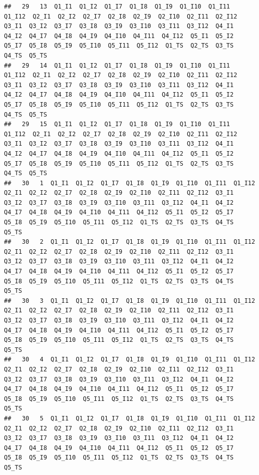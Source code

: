 \documentclass[
]{book}
\begin{document}
\begin{verbatim}
##   29   13  Q1_I1  Q1_I2  Q1_I7  Q1_I8  Q1_I9  Q1_I10  Q1_I11  Q1_I12  Q2_I1  Q2_I2  Q2_I7  Q2_I8  Q2_I9  Q2_I10  Q2_I11  Q2_I12  Q3_I1  Q3_I2  Q3_I7  Q3_I8  Q3_I9  Q3_I10  Q3_I11  Q3_I12  Q4_I1  Q4_I2  Q4_I7  Q4_I8  Q4_I9  Q4_I10  Q4_I11  Q4_I12  Q5_I1  Q5_I2  Q5_I7  Q5_I8  Q5_I9  Q5_I10  Q5_I11  Q5_I12  Q1_TS  Q2_TS  Q3_TS  Q4_TS  Q5_TS
##   29   14  Q1_I1  Q1_I2  Q1_I7  Q1_I8  Q1_I9  Q1_I10  Q1_I11  Q1_I12  Q2_I1  Q2_I2  Q2_I7  Q2_I8  Q2_I9  Q2_I10  Q2_I11  Q2_I12  Q3_I1  Q3_I2  Q3_I7  Q3_I8  Q3_I9  Q3_I10  Q3_I11  Q3_I12  Q4_I1  Q4_I2  Q4_I7  Q4_I8  Q4_I9  Q4_I10  Q4_I11  Q4_I12  Q5_I1  Q5_I2  Q5_I7  Q5_I8  Q5_I9  Q5_I10  Q5_I11  Q5_I12  Q1_TS  Q2_TS  Q3_TS  Q4_TS  Q5_TS
##   29   15  Q1_I1  Q1_I2  Q1_I7  Q1_I8  Q1_I9  Q1_I10  Q1_I11  Q1_I12  Q2_I1  Q2_I2  Q2_I7  Q2_I8  Q2_I9  Q2_I10  Q2_I11  Q2_I12  Q3_I1  Q3_I2  Q3_I7  Q3_I8  Q3_I9  Q3_I10  Q3_I11  Q3_I12  Q4_I1  Q4_I2  Q4_I7  Q4_I8  Q4_I9  Q4_I10  Q4_I11  Q4_I12  Q5_I1  Q5_I2  Q5_I7  Q5_I8  Q5_I9  Q5_I10  Q5_I11  Q5_I12  Q1_TS  Q2_TS  Q3_TS  Q4_TS  Q5_TS
##   30   1  Q1_I1  Q1_I2  Q1_I7  Q1_I8  Q1_I9  Q1_I10  Q1_I11  Q1_I12  Q2_I1  Q2_I2  Q2_I7  Q2_I8  Q2_I9  Q2_I10  Q2_I11  Q2_I12  Q3_I1  Q3_I2  Q3_I7  Q3_I8  Q3_I9  Q3_I10  Q3_I11  Q3_I12  Q4_I1  Q4_I2  Q4_I7  Q4_I8  Q4_I9  Q4_I10  Q4_I11  Q4_I12  Q5_I1  Q5_I2  Q5_I7  Q5_I8  Q5_I9  Q5_I10  Q5_I11  Q5_I12  Q1_TS  Q2_TS  Q3_TS  Q4_TS  Q5_TS
##   30   2  Q1_I1  Q1_I2  Q1_I7  Q1_I8  Q1_I9  Q1_I10  Q1_I11  Q1_I12  Q2_I1  Q2_I2  Q2_I7  Q2_I8  Q2_I9  Q2_I10  Q2_I11  Q2_I12  Q3_I1  Q3_I2  Q3_I7  Q3_I8  Q3_I9  Q3_I10  Q3_I11  Q3_I12  Q4_I1  Q4_I2  Q4_I7  Q4_I8  Q4_I9  Q4_I10  Q4_I11  Q4_I12  Q5_I1  Q5_I2  Q5_I7  Q5_I8  Q5_I9  Q5_I10  Q5_I11  Q5_I12  Q1_TS  Q2_TS  Q3_TS  Q4_TS  Q5_TS
##   30   3  Q1_I1  Q1_I2  Q1_I7  Q1_I8  Q1_I9  Q1_I10  Q1_I11  Q1_I12  Q2_I1  Q2_I2  Q2_I7  Q2_I8  Q2_I9  Q2_I10  Q2_I11  Q2_I12  Q3_I1  Q3_I2  Q3_I7  Q3_I8  Q3_I9  Q3_I10  Q3_I11  Q3_I12  Q4_I1  Q4_I2  Q4_I7  Q4_I8  Q4_I9  Q4_I10  Q4_I11  Q4_I12  Q5_I1  Q5_I2  Q5_I7  Q5_I8  Q5_I9  Q5_I10  Q5_I11  Q5_I12  Q1_TS  Q2_TS  Q3_TS  Q4_TS  Q5_TS
##   30   4  Q1_I1  Q1_I2  Q1_I7  Q1_I8  Q1_I9  Q1_I10  Q1_I11  Q1_I12  Q2_I1  Q2_I2  Q2_I7  Q2_I8  Q2_I9  Q2_I10  Q2_I11  Q2_I12  Q3_I1  Q3_I2  Q3_I7  Q3_I8  Q3_I9  Q3_I10  Q3_I11  Q3_I12  Q4_I1  Q4_I2  Q4_I7  Q4_I8  Q4_I9  Q4_I10  Q4_I11  Q4_I12  Q5_I1  Q5_I2  Q5_I7  Q5_I8  Q5_I9  Q5_I10  Q5_I11  Q5_I12  Q1_TS  Q2_TS  Q3_TS  Q4_TS  Q5_TS
##   30   5  Q1_I1  Q1_I2  Q1_I7  Q1_I8  Q1_I9  Q1_I10  Q1_I11  Q1_I12  Q2_I1  Q2_I2  Q2_I7  Q2_I8  Q2_I9  Q2_I10  Q2_I11  Q2_I12  Q3_I1  Q3_I2  Q3_I7  Q3_I8  Q3_I9  Q3_I10  Q3_I11  Q3_I12  Q4_I1  Q4_I2  Q4_I7  Q4_I8  Q4_I9  Q4_I10  Q4_I11  Q4_I12  Q5_I1  Q5_I2  Q5_I7  Q5_I8  Q5_I9  Q5_I10  Q5_I11  Q5_I12  Q1_TS  Q2_TS  Q3_TS  Q4_TS  Q5_TS

\end{verbatim}
\end{document}
